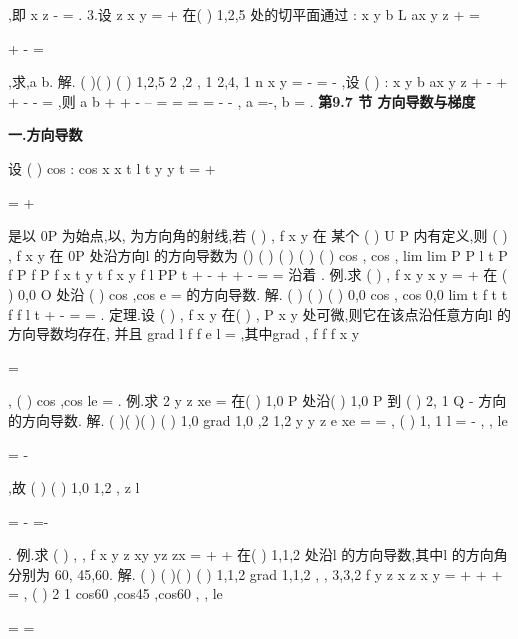 ,即
x
z
-
=
. 
3.设
z
x
y
=
+
在(
)
1,2,5 处的切平面通过
:
x
y
b
L
ax
y
z
+
=


+
-
=

,求,a b. 
解.
(
)(
)
(
)
1,2,5
2 ,2 , 1
2,4, 1
n
x
y
=
-
=
-
\rho 
,设
(
)
:
x
y
b
ax
y
z
\lambda 
\Pi 
+
-
+
+
-
-
=
,则 
a
b
\lambda 
\lambda 
\lambda 
\lambda 
\lambda 
+
+
-
--
=
=
=
\Rightarrow 
=
-
-
,
a =-,
b =
. 
\vspace{6pt}
{\large \bfseries \textcolor{lyred}{第9.7 节 方向导数与梯度}}

\vspace{4pt}
{\bfseries \textcolor{lyred}{一.方向导数}}

设
(
)
cos
:
cos
x
x
t
l
t
y
y
t
\alpha 
\beta 
=
+

\ge 

=
+

是以
0P 为始点,以\alpha , \beta 为方向角的射线,若
(
)
,
f x y 在 
某个
(
)
U P 内有定义,则
(
)
,
f x y 在
0P 处沿方向l 的\textcolor{lyred}{方向导数}为 
()
(
)
(
)
(
)
(
)
cos
, 
cos
,
lim
lim
P
P
l
t
P
f P
f P
f x
t
y
t
f x
y
f
l
PP
t
\alpha 
\beta 
+
\to 
\to 
-
+
+
-
\partial 
=
=
\partial 
沿着
. 
\textcolor{lyred}{例}.求
(
)
,
f x y
x
y
=
+
在
(
)
0,0
O
处沿
(
)
cos
,cos
e
\alpha 
\beta 
=
\rho 
的方向导数. 
解.
(
)
(
)
(
)
0,0
cos
, cos
0,0
lim
t
f t
t
f
f
l
t
\alpha 
\beta 
+
\to 
-
\partial 
=
=
\partial 
. 
\textcolor{lyred}{定理}.设
(
)
,
f x y 在(
)
,
P x y 处可微,则它在该点沿任意方向l 的方向导数均存在, 
并且
grad
l
f
f e
l
\partial 
=
\cdots 
\partial 
\rho ,其中grad
,
f
f
f
x
y


\partial 
\partial 
=

\partial 
\partial 


,
(
)
cos ,cos
le
\alpha 
\beta 
=
\rho 
. 
\textcolor{lyred}{例}.求
2 y
z
xe
=
在(
)
1,0
P
处沿(
)
1,0
P
到
(
)
2, 1
Q
-
方向的方向导数. 
解.
(
)(
)(
)
(
)
1,0
grad
1,0
,2
1,2
y
y
z
e
xe
=
=
,
(
)
1, 1
l =
-
\rho 
,
,
le


=
-




\rho 
,故 
(
)
(
)
1,0
1,2
,
z
l
\partial 


=
\cdots 
-
=-


\partial 


. 
\textcolor{lyred}{例}.求
(
)
, ,
f x y z
xy
yz
zx
=
+
+
在(
)
1,1,2 处沿l
\rho 
的方向导数,其中l
\rho 
的方向角分别为 
60\circ , 45\circ ,60\circ . 
解.
(
)
(
)(
)
(
)
1,1,2
grad
1,1,2
,
,
3,3,2
f
y
z x
z x
y
=
+
+
+
=
, 
(
)
2 1
cos60 ,cos45 ,cos60
,
,
le


=
=






